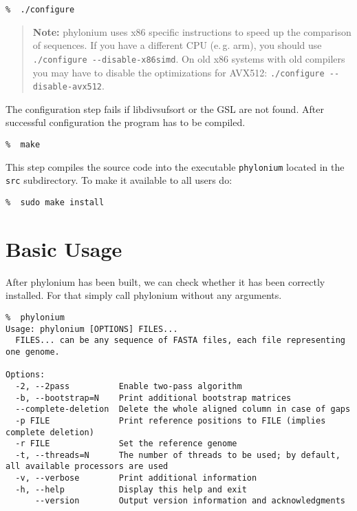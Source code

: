 \documentclass[a4paper,10pt,english]{scrartcl}
\newcommand{\tool}[1]{\textsf{#1}}
\newcommand{\phylonium}{\textsf{phylonium}\xspace}
\begin{document}
\begin{lstlisting}
%  ./configure
\end{lstlisting}

\begin{quotation}
\textbf{Note:} \phylonium uses x86 specific instructions to speed up the comparison of sequences. If you have a different CPU (e.\,g. arm), you should use \lstinline!./configure --disable-x86simd!. On old x86 systems with old compilers you may have to disable the optimizations for AVX512: \lstinline!./configure --disable-avx512!.
\end{quotation}

The configuration step fails if \tool{libdivsufsort} or the \tool{GSL} are not found. After successful configuration the program has to be compiled.

\begin{lstlisting}
%  make
\end{lstlisting}

This step compiles the source code into the executable \lstinline!phylonium! located in the \lstinline!src! subdirectory. To make it available to all users do:

\begin{lstlisting}
%  sudo make install
\end{lstlisting}


\section{Basic Usage}

After \phylonium has been built, we can check whether it has been correctly installed. For that simply call \phylonium without any arguments.

\begin{lstlisting}
%  phylonium
Usage: phylonium [OPTIONS] FILES...
  FILES... can be any sequence of FASTA files, each file representing one genome.

Options:
  -2, --2pass          Enable two-pass algorithm
  -b, --bootstrap=N    Print additional bootstrap matrices
  --complete-deletion  Delete the whole aligned column in case of gaps
  -p FILE              Print reference positions to FILE (implies complete deletion)
  -r FILE              Set the reference genome
  -t, --threads=N      The number of threads to be used; by default, all available processors are used
  -v, --verbose        Print additional information
  -h, --help           Display this help and exit
      --version        Output version information and acknowledgments
\end{lstlisting}
\end{document}

